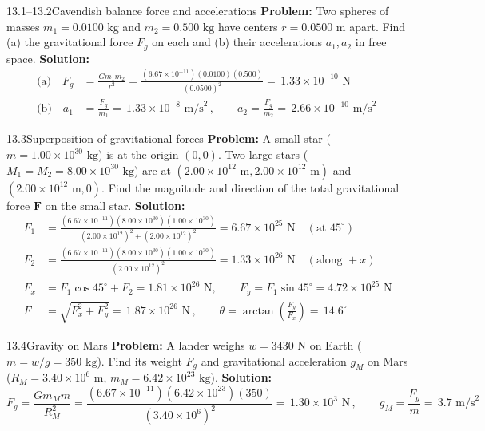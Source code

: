 \documentclass[11pt,a4paper,openany,oneside]{book}
\newcommand{\eqbox}[1]{\boxed{\,#1\,}}
\newcommand{\vect}[1]{\mathbf{#1}}
\numberwithin{equation}{chapter}
\newcommand{\bk}[1]{\texorpdfstring{\enspace{\normalfont\small\color{slate}[Book #1]}}{ [Book #1]}}
\begin{document}
\begin{example}{13.1--13.2}{Cavendish balance force and accelerations\bk{p.\ 405}}
\textbf{Problem:} Two spheres of masses $m_1 = 0.0100\text{ kg}$ and $m_2 = 0.500\text{ kg}$ have centers $r = 0.0500\text{ m}$ apart. Find (a) the gravitational force $F_g$ on each and (b) their accelerations $a_1, a_2$ in free space.
\tcblower
\textbf{Solution:}
\begin{align*}
  \text{(a)}\quad F_g &= \frac{Gm_1 m_2}{r^2} = \frac{(6.67\times 10^{-11})(0.0100)(0.500)}{(0.0500)^2} = \eqbox{1.33\times 10^{-10}\text{ N}}\\
  \text{(b)}\quad a_1 &= \frac{F_g}{m_1} = \eqbox{1.33\times 10^{-8}\text{ m/s}^2}, \qquad a_2 = \frac{F_g}{m_2} = \eqbox{2.66\times 10^{-10}\text{ m/s}^2}
\end{align*}
\end{example}

\begin{example}{13.3}{Superposition of gravitational forces\bk{p.\ 405}}
\textbf{Problem:} A small star ($m = 1.00\times 10^{30}\text{ kg}$) is at the origin $(0,0)$. Two large stars ($M_1 = M_2 = 8.00\times 10^{30}\text{ kg}$) are at $(2.00\times 10^{12}\text{ m}, 2.00\times 10^{12}\text{ m})$ and $(2.00\times 10^{12}\text{ m}, 0)$. Find the magnitude and direction of the total gravitational force $\vect{F}$ on the small star.
\tcblower
\textbf{Solution:}
\begin{align*}
  F_1 &= \frac{(6.67\times 10^{-11})(8.00\times 10^{30})(1.00\times 10^{30})}{(2.00\times 10^{12})^2 + (2.00\times 10^{12})^2} = 6.67\times 10^{25}\text{ N}\quad (\text{at }45^\circ)\\
  F_2 &= \frac{(6.67\times 10^{-11})(8.00\times 10^{30})(1.00\times 10^{30})}{(2.00\times 10^{12})^2} = 1.33\times 10^{26}\text{ N}\quad (\text{along }+x)\\
  F_x &= F_1\cos 45^\circ + F_2 = 1.81\times 10^{26}\text{ N}, \qquad F_y = F_1\sin 45^\circ = 4.72\times 10^{25}\text{ N}\\
  F &= \sqrt{F_x^2 + F_y^2} = \eqbox{1.87\times 10^{26}\text{ N}}, \qquad \theta = \arctan\!\left(\frac{F_y}{F_x}\right) = \eqbox{14.6^\circ}
\end{align*}
\end{example}

\begin{example}{13.4}{Gravity on Mars\bk{p.\ 408}}
\textbf{Problem:} A lander weighs $w = 3430\text{ N}$ on Earth ($m = w/g = 350\text{ kg}$). Find its weight $F_g$ and gravitational acceleration $g_M$ on Mars ($R_M = 3.40\times 10^6\text{ m}$, $m_M = 6.42\times 10^{23}\text{ kg}$).
\tcblower
\textbf{Solution:}
\begin{equation*}
  F_g = \frac{Gm_M m}{R_M^2} = \frac{(6.67\times 10^{-11})(6.42\times 10^{23})(350)}{(3.40\times 10^6)^2} = \eqbox{1.30\times 10^3\text{ N}}, \qquad g_M = \frac{F_g}{m} = \eqbox{3.7\text{ m/s}^2}
\end{equation*}
\end{example}
\end{document}
